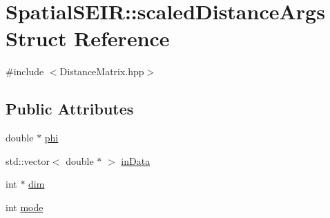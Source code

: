 \hypertarget{structSpatialSEIR_1_1scaledDistanceArgs}{\section{Spatial\-S\-E\-I\-R\-:\-:scaled\-Distance\-Args Struct Reference}
\label{structSpatialSEIR_1_1scaledDistanceArgs}
}


{\ttfamily \#include $<$Distance\-Matrix.\-hpp$>$}

\subsection*{Public Attributes}
\begin{DoxyCompactItemize}
\item 
double $\ast$ \hyperlink{structSpatialSEIR_1_1scaledDistanceArgs_ade9b8cabc3faa5a2a8c27c18d1a99ec6}{phi}
\item 
std\-::vector$<$ double $\ast$ $>$ \hyperlink{structSpatialSEIR_1_1scaledDistanceArgs_a2f088ea1220ce3eb17762e7ee51c5249}{in\-Data}
\item 
int $\ast$ \hyperlink{structSpatialSEIR_1_1scaledDistanceArgs_a298c111f01f4b8d7950c6b83532fbd97}{dim}
\item 
int \hyperlink{structSpatialSEIR_1_1scaledDistanceArgs_ad9c4a2a8701453b54110ad51164aa39e}{mode}
\end{DoxyCompactItemize}


